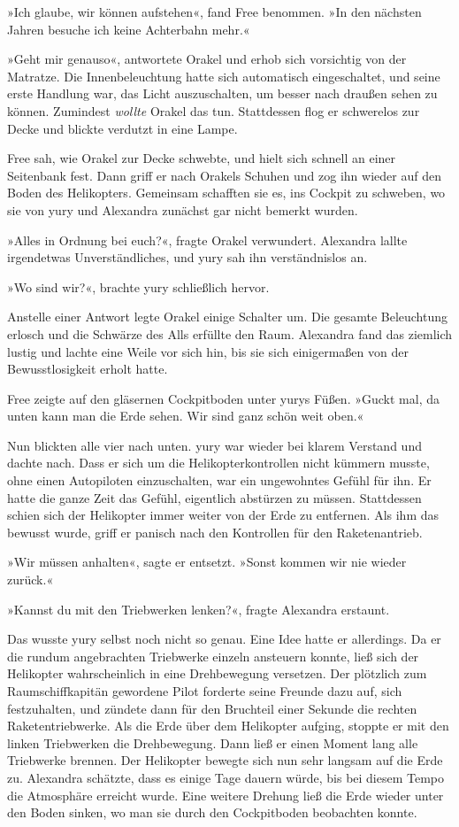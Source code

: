 »Ich glaube, wir können aufstehen«, fand Free benommen. »In den nächsten Jahren besuche ich keine Achterbahn mehr.«

»Geht mir genauso«, antwortete Orakel und erhob sich vorsichtig von der Matratze. Die Innenbeleuchtung hatte sich automatisch eingeschaltet, und seine erste Handlung war, das Licht auszuschalten, um besser nach draußen sehen zu können. Zumindest \textit{wollte} Orakel das tun. Stattdessen flog er schwerelos zur Decke und blickte verdutzt in eine Lampe.

Free sah, wie Orakel zur Decke schwebte, und hielt sich schnell an einer Seitenbank fest. Dann griff er nach Orakels Schuhen und zog ihn wieder auf den Boden des Helikopters. Gemeinsam schafften sie es, ins Cockpit zu schweben, wo sie von yury und Alexandra zunächst gar nicht bemerkt wurden.

»Alles in Ordnung bei euch?«, fragte Orakel verwundert. Alexandra lallte irgendetwas Unverständliches, und yury sah ihn verständnislos an.

»Wo sind wir?«, brachte yury schließlich hervor.

Anstelle einer Antwort legte Orakel einige Schalter um. Die gesamte Beleuchtung erlosch und die Schwärze des Alls erfüllte den Raum. Alexandra fand das ziemlich lustig und lachte eine Weile vor sich hin, bis sie sich einigermaßen von der Bewusstlosigkeit erholt hatte.

Free zeigte auf den gläsernen Cockpitboden unter yurys Füßen. »Guckt mal, da unten kann man die Erde sehen. Wir sind ganz schön weit oben.«

Nun blickten alle vier nach unten. yury war wieder bei klarem Verstand und dachte nach. Dass er sich um die Helikopterkontrollen nicht kümmern musste, ohne einen Autopiloten einzuschalten, war ein ungewohntes Gefühl für ihn. Er hatte die ganze Zeit das Gefühl, eigentlich abstürzen zu müssen. Stattdessen schien sich der Helikopter immer weiter von der Erde zu entfernen. Als ihm das bewusst wurde, griff er panisch nach den Kontrollen für den Raketenantrieb.

»Wir müssen anhalten«, sagte er entsetzt. »Sonst kommen wir nie wieder zurück.«

»Kannst du mit den Triebwerken lenken?«, fragte Alexandra erstaunt.

Das wusste yury selbst noch nicht so genau. Eine Idee hatte er allerdings. Da er die rundum angebrachten Triebwerke einzeln ansteuern konnte, ließ sich der Helikopter wahrscheinlich in eine Drehbewegung versetzen. Der plötzlich zum Raumschiffkapitän gewordene Pilot forderte seine Freunde dazu auf, sich festzuhalten, und zündete dann für den Bruchteil einer Sekunde die rechten Raketentriebwerke. Als die Erde über dem Helikopter aufging, stoppte er mit den linken Triebwerken die Drehbewegung. Dann ließ er einen Moment lang alle Triebwerke brennen. Der Helikopter bewegte sich nun sehr langsam auf die Erde zu. Alexandra schätzte, dass es einige Tage dauern würde, bis bei diesem Tempo die Atmosphäre erreicht wurde. Eine weitere Drehung ließ die Erde wieder unter den Boden sinken, wo man sie durch den Cockpitboden beobachten konnte.

